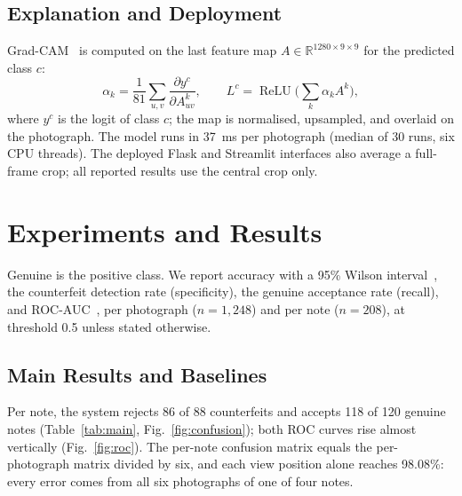\documentclass[journal]{IEEEtran}
\begin{document}
\subsection{Explanation and Deployment}
Grad-CAM~\cite{selvaraju2017gradcam} is computed on the last feature map
$A\in\mathbb{R}^{1280\times9\times9}$ for the predicted class $c$:
\begin{equation}
\alpha_k = \frac{1}{81}\sum_{u,v}\frac{\partial y^{c}}{\partial A^{k}_{uv}},\qquad
L^{c} = \operatorname{ReLU}\!\Big(\sum_{k}\alpha_k A^{k}\Big),
\label{eq:gradcam}
\end{equation}
where $y^c$ is the logit of class $c$; the map is normalised, upsampled, and overlaid on
the photograph. The model runs in 37~ms per photograph (median of 30 runs, six CPU threads). The
deployed Flask and Streamlit interfaces also average a full-frame crop; all reported
results use the central crop only.

\section{Experiments and Results}
\label{sec:results}

Genuine is the positive class. We report accuracy with a 95\% Wilson
interval~\cite{wilson1927probable}, the counterfeit detection rate (specificity), the
genuine acceptance rate (recall), and ROC-AUC~\cite{fawcett2006roc}, per photograph
($n=1{,}248$) and per note ($n=208$), at threshold 0.5 unless stated otherwise.

\subsection{Main Results and Baselines}
Per note, the system rejects 86 of 88 counterfeits and accepts 118 of 120 genuine notes
(Table~\ref{tab:main}, Fig.~\ref{fig:confusion}); both ROC curves rise almost vertically
(Fig.~\ref{fig:roc}). The per-note confusion matrix equals the per-photograph matrix
divided by six, and each view position alone reaches 98.08\%: every error comes from all
six photographs of one of four notes.
\end{document}
